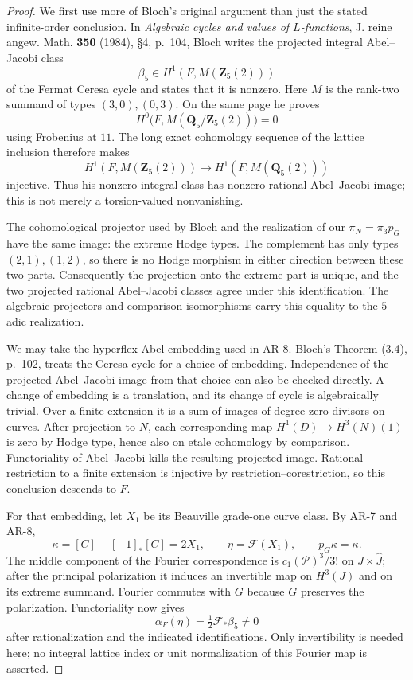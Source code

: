 \documentclass[11pt,a4paper]{article}
\begin{document}
\begin{proof}
We first use more of Bloch's original argument than just the stated
infinite-order conclusion.  In \emph{Algebraic cycles and values of
$L$-functions}, J. reine angew. Math. \textbf{350} (1984), \S4,
p.~104, Bloch writes the projected integral Abel--Jacobi class
\[
 \beta_5\in H^1(F,M(\mathbf Z_5(2)))
\]
of the Fermat Ceresa cycle and states that it is nonzero.  Here $M$ is
the rank-two summand of types $(3,0),(0,3)$.  On the same page he proves
\[
 H^0\bigl(F,M(\mathbf Q_5/\mathbf Z_5(2))\bigr)=0
\]
using Frobenius at $11$.  The long exact cohomology sequence of the
lattice inclusion therefore makes
\[
 H^1(F,M(\mathbf Z_5(2)))\longrightarrow
 H^1(F,M(\mathbf Q_5(2)))
\]
injective.  Thus his nonzero integral class has nonzero rational
Abel--Jacobi image; this is not merely a torsion-valued nonvanishing.

The cohomological projector used by Bloch and the realization of our
$\pi_N=\pi_3p_G$ have the same image: the extreme Hodge types.  The
complement has only types $(2,1),(1,2)$, so there is no Hodge morphism
in either direction between these two parts.  Consequently the
projection onto the extreme part is unique, and the two projected
rational Abel--Jacobi classes agree under this identification.  The
algebraic projectors and comparison isomorphisms carry this equality
to the $5$-adic realization.

We may take the hyperflex Abel embedding used in AR-8.  Bloch's
Theorem (3.4), p.~102, treats the Ceresa cycle for a choice of
embedding.  Independence of the projected Abel--Jacobi image from
that choice can also be checked directly.  A change of embedding is
a translation, and its change of cycle is algebraically trivial.
Over a finite extension it is a sum of images of degree-zero
divisors on curves.  After projection to $N$, each corresponding
map $H^1(D)\to H^3(N)(1)$ is zero by Hodge type, hence also on
etale cohomology by comparison.  Functoriality of Abel--Jacobi kills
the resulting projected image.  Rational restriction to a finite
extension is injective by restriction--corestriction, so this
conclusion descends to $F$.

For that embedding, let $X_1$ be its Beauville grade-one curve class.
By AR-7 and AR-8,
\[
 \kappa=[C]-[-1]_*[C]=2X_1,
 \qquad \eta=\mathcal F(X_1),\qquad p_G\kappa=\kappa.
\]
The middle component of the Fourier correspondence is
$c_1(\mathcal P)^3/3!$ on $J\times\widehat J$; after the principal
polarization it induces an invertible map on $H^3(J)$ and on its
extreme summand.  Fourier commutes with $G$ because $G$ preserves
the polarization.  Functoriality now gives
\[
 \alpha_F(\eta)=\tfrac12\mathcal F_*\beta_5\ne0
\]
after rationalization and the indicated identifications.  Only
invertibility is needed here; no integral lattice index or unit
normalization of this Fourier map is asserted.


\end{proof}
\end{document}
